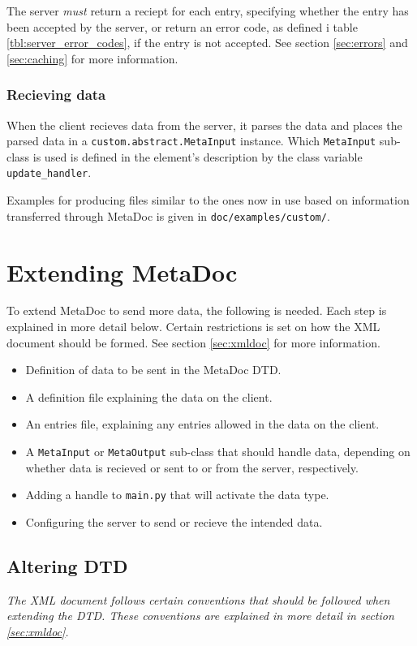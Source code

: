 \documentclass[titlepage, a4paper,10pt]{article}
\begin{document}
The server \textit{must} return a reciept for each entry, specifying whether
the entry has been accepted by the server, or return an error code, as defined
i table \ref{tbl:server_error_codes}, if the entry is not accepted. See
section \ref{sec:errors} and \ref{sec:caching} for more information.

\subsubsection{Recieving data}
When the client recieves data from the server, it parses the data and places
the parsed data in a \texttt{custom.abstract.MetaInput} instance. Which
\texttt{MetaInput} sub-class is used is defined in the element's description by
the class variable \texttt{update\_handler}.

Examples for producing files similar to the ones now in use based on
information transferred through MetaDoc is given in
\texttt{doc/examples/custom/}.

\newpage
\section{Extending MetaDoc}
To extend MetaDoc to send more data, the following is needed. Each step is 
explained in more detail below. Certain restrictions is set on how the XML
document should be formed. See section \ref{sec:xmldoc} for more information.

\begin{itemize}
    \item
        Definition of data to be sent in the MetaDoc DTD.
    \item
        A definition file explaining the data on the client.
    \item
        An entries file, explaining any entries allowed in the data on the 
        client.
    \item
        A \texttt{MetaInput} or \texttt{MetaOutput} sub-class that should
        handle data, depending on whether data is recieved or sent to or from
        the server, respectively.
    \item
        Adding a handle to \texttt{main.py} that will activate the data type.
    \item
        Configuring the server to send or recieve the intended data.
\end{itemize}

\subsection{Altering DTD}
\textit{The XML document follows certain conventions that should be followed when
extending the DTD. These conventions are explained in more detail in section
\ref{sec:xmldoc}.}
\end{document}
